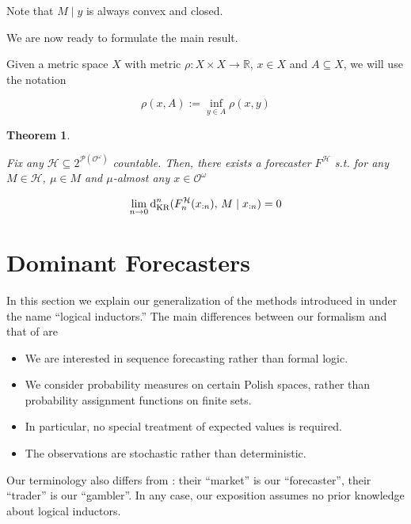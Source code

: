 \documentclass[11pt]{article}
\theoremstyle{definition}
\theoremstyle{plain}
\newtheorem{theorem}{Theorem}%
\newcommand{\Reals}{\mathbb{R}}
\newcommand{\PM}{\mathcal{P}}
\newcommand{\DKR}{\operatorname{d}_{\textnormal{KR}}}
\newcommand{\Ob}{\mathcal{O}}
\newcommand{\OO}{\Ob^\omega}
\newcommand{\PMO}{\PM(\OO)}
\newcommand{\MC}{\mathcal{H}}
\begin{document}
Note that $M \mid y$ is always convex and closed.

We are now ready to formulate the main result.

Given a metric space $X$ with metric $\rho: X \times X \rightarrow \Reals$, $x \in X$ and $A \subseteq X$, we will use the notation

\begin{equation}
\rho(x,A):=\inf_{y \in A} \rho(x,y)
\end{equation}

\begin{theorem}
\label{thm:main}

Fix any $\MC \subseteq 2^{\PMO}$ countable. Then, there exists a forecaster $F^\MC$ s.t. for any $M \in \MC$, $\mu \in M$ and $\mu$-almost any $x \in \OO$

\begin{equation}
\label{eqn:thm_main}
\lim_{n \rightarrow 0} \DKR^n(F^\MC_n(x_{:n}),\, M \mid x_{:n}) = 0
\end{equation}

\end{theorem}

\section{Dominant Forecasters}
\label{sec:garrabrant}

In this section we explain our generalization of the methods introduced in \cite{Garrabrant_2016} under the name \enquote{logical inductors.} The main differences between our formalism and that of \cite{Garrabrant_2016} are

\begin{itemize}
\item 
We are interested in sequence forecasting rather than formal logic.
\item
We consider probability measures on certain Polish spaces, rather than probability assignment functions on finite sets.
\item
In particular, no special treatment of expected values is required.
\item
The observations are stochastic rather than deterministic.
\end{itemize}

Our terminology also differs from \cite{Garrabrant_2016}: their \enquote{market} is our \enquote{forecaster}, their \enquote{trader} is our \enquote{gambler}. In any case, our exposition assumes no prior knowledge about logical inductors.
\end{document}
